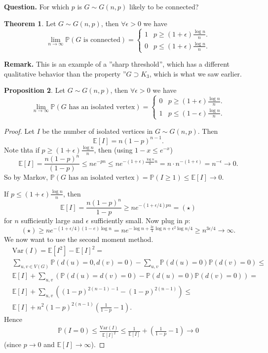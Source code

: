 \documentclass{article}
\theoremstyle{definition}
\newtheorem{theorem}{Theorem}[section]
\newtheorem{prop}[theorem]{Proposition}
\begin{document}
\textbf{Question.} For which $p$ is $G\sim G(n,p)$ likely to be connected? 
\begin{theorem}\label{6.4}
    Let $G \sim G(n,p)$, then $\forall \epsilon>0$ we have \[
    \lim_{n \to \infty} \mathbb{P}(G \text{ is connected}) = \begin{cases}
        1 &p\ge (1+\epsilon)\frac{\log n}{n}.\\
        0 &p\le (1+\epsilon)\frac{\log n}{n}.
    \end{cases}
    \]
\end{theorem}
\textbf{Remark.} This is an example of a ''sharp threshold'', which has a different qualitative behavior than the property ''$G \supset K_3$, which is what we saw earlier.
\begin{prop}
    Let $G\sim G(n,p)$, then $\forall \epsilon>0$ we have \[
    \lim_{n \to \infty}\mathbb{P}(G \text{ has an isolated vertex})=\begin{cases}
        0 &p\ge (1+\epsilon)\frac{\log n}{n}.\\
        1 &p\le (1-\epsilon)\frac{\log n}{n}.
    \end{cases}
    \]
\end{prop}
\begin{proof}
    Let $I$ be the number of isolated vertices in $G \sim G(n,p)$. Then \[
    \mathbb{E}[I]=n(1-p)^{n-1}.
    \]
    Note thta if $p \ge (1+\epsilon)\frac{\log n}{n}$, then (using $1-x \le e^{-x}$) \[
        \mathbb{E}[I] = \frac{n(1-p)^n}{(1-p)} \le ne^{-pn} \le ne^{-(1+\epsilon)\frac{\log n}{n}n} = n \cdot n^{-(1+\epsilon)} = n^{-\epsilon} \to 0.
    \]
    So by Markov, $\mathbb{P}(G \text{ has an isolated vertex})= \mathbb{P}(I \ge 1) \le \mathbb{E}[I] \to 0$.
    \vspace{1mm}
    
    If $p\le (1+\epsilon)\frac{\log n}{n}$, then \[
    \mathbb{E}[I]=\frac{n(1-p)^{n}}{1-p} \ge ne^{-(1+\epsilon/4)pn} = (\star)
    \]
    for $n$ sufficiently large and $\epsilon$ sufficiently small. Now plug in $p$:
    \[
    (\star) \ge n e^{-(1+\epsilon/4)(1-e)\log n} = n e^{-\log n + \frac{3\epsilon}{4}\log n + \epsilon^2 \log n/4} \ge n^{3\epsilon/4} \to \infty.
    \]
    We now want to use the second moment method. 
    \begin{align*}
        &\text{Var}(I)=\mathbb{E}[I^2]-\mathbb{E}[I]^2 = \\
        &\sum_{u,v \in V(G)}^{} \mathbb{P}(d(u)=0, d(v)=0) - \sum_{u,v}^{}  \mathbb{P}(d(u)=0)\mathbb{P}(d(v)=0) \le \\
        &\mathbb{E}[I] + \sum_{u,v}^{} \left(\mathbb{P}(d(u)=d(v)=0)-\mathbb{P}(d(u)=0)\mathbb{P}(d(v)=0)\right) = \\
        &\mathbb{E}[I] + \sum_{u,v}^{} \left((1-p)^{2(n-1)-1} - (1-p)^{2(n-1)}\right) \le \\
        &\mathbb{E}[I] + n^2(1-p)^{2(n-1)} \left(\frac{1}{1-p}-1\right).
    \end{align*}
    Hence
    \begin{align*}
        \mathbb{P}(I=0) \le \frac{\text{Var}(I)}{\mathbb{E}[I]^2} \le \frac{1}{\mathbb{E}[I]} + \left(\frac{1}{1-p}-1\right) \to 0
    \end{align*}
    (since $p \to 0$ and $\mathbb{E}[I]\to \infty$).
\end{proof}
\end{document}
